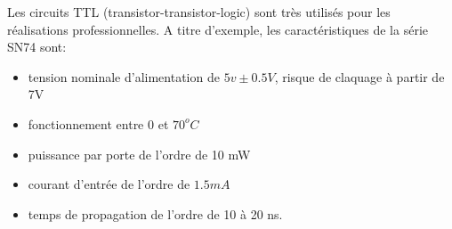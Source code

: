 Les circuits TTL (transistor-transistor-logic) sont tr\`es utilis\'es pour
les r\'ealisations professionnelles. A titre d'exemple, 
les caract\'eristiques de la s\'erie SN74
sont:
\begin{itemize}
\item tension nominale d'alimentation de $5v \pm 0.5V$, 
risque de claquage \`a partir de 7V
\item fonctionnement entre $0$ et $70^oC$
\item puissance par porte de l'ordre de 10 mW
\item courant d'entr\'ee de l'ordre de $1.5 mA$
\item temps de propagation de l'ordre de 10 \`a 20 ns.
\end{itemize} 



